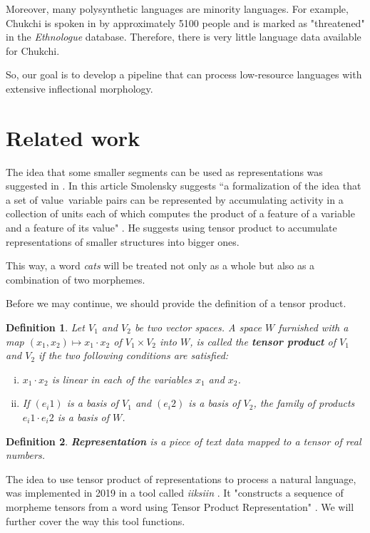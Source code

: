 \documentclass[leqno]{article}
\newtheorem{theorem}{Definition}
\begin{document}
Moreover, many polysynthetic languages are minority languages.
For example, Chukchi is spoken in by approximately 5100 people
and is marked as "threatened" in the \textit{Ethnologue}
database\parencite{ethn}.
Therefore, there is very little language data available for Chukchi.

So, our goal is to develop a pipeline that can process
low-resource languages with extensive inflectional morphology.

\section{Related work}

The idea that some smaller segments can be used as representations was suggested in \parencite{tpr1990}.
In this article Smolensky suggests ``a formalization of the idea that a set of value~variable
pairs can be represented by accumulating activity in a collection of units each of which computes the
product of a feature of a variable and a feature of its value" \parencite[p. 159]{tpr1990}.
He suggests using tensor product to accumulate representations of smaller structures into
bigger ones.

This way, a word \textit{cats} will be treated not only as a whole but also as a combination
of two morphemes.

Before we may continue, we should provide the definition of a tensor product.

\begin{theorem}
Let $V_1$ and $V_2$ be two vector spaces.
A space $W$ furnished with a map $(x_1, x_2) \mapsto x_1 \cdot x_2$
of $V_1 \times V_2$ into $W$,
is called the \textbf{tensor product} of $V_1$ and $V_2$ if the two following conditions are satisfied:
\begin{enumerate}[i.]
    \item $x_1 \cdot x_2$ is linear in each of the variables $x_1$ and $x_2$.
    \item If $(e_i1)$ is a basis of $V_1$ and $(e_i2)$ is a basis of $V_2$, the family of products $e_i1 \cdot e_i2$ is a basis of $W$.
\end{enumerate}
\end{theorem} \parencite[p. 8]{tensorProduct}

\begin{theorem}
\textbf{Representation} is a piece of text data mapped to
a tensor of real numbers.
\end{theorem}

The idea to use tensor product of representations to process a natural language, was implemented in 2019 in a tool called \textit{iiksiin} \parencite{schwartz2020neural, iiksiin}.
It "constructs a sequence of morpheme tensors from a word using Tensor Product Representation"
\parencite{iiksiin}. We will further cover the way this tool functions.
\end{document}

